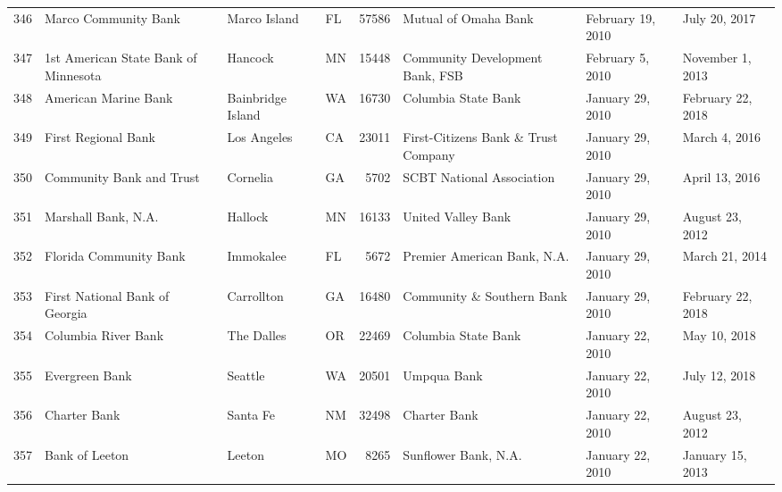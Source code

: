 \begin{tabular}{llllrlll}
346 &                               Marco Community Bank &        Marco Island &  FL &  57586 &                               Mutual of Omaha Bank &   February 19, 2010 &       July 20, 2017 \\
347 &               1st American State Bank of Minnesota &             Hancock &  MN &  15448 &                    Community Development Bank, FSB &    February 5, 2010 &    November 1, 2013 \\
348 &                               American Marine Bank &   Bainbridge Island &  WA &  16730 &                                Columbia State Bank &    January 29, 2010 &   February 22, 2018 \\
349 &                                First Regional Bank &         Los Angeles &  CA &  23011 &                First-Citizens Bank \& Trust Company &    January 29, 2010 &       March 4, 2016 \\
350 &                           Community Bank and Trust &            Cornelia &  GA &   5702 &                          SCBT National Association &    January 29, 2010 &      April 13, 2016 \\
351 &                                Marshall Bank, N.A. &             Hallock &  MN &  16133 &                                 United Valley Bank &    January 29, 2010 &     August 23, 2012 \\
352 &                             Florida Community Bank &           Immokalee &  FL &   5672 &                        Premier American Bank, N.A. &    January 29, 2010 &      March 21, 2014 \\
353 &                     First National Bank of Georgia &          Carrollton &  GA &  16480 &                          Community \& Southern Bank &    January 29, 2010 &   February 22, 2018 \\
354 &                                Columbia River Bank &          The Dalles &  OR &  22469 &                                Columbia State Bank &    January 22, 2010 &        May 10, 2018 \\
355 &                                     Evergreen Bank &             Seattle &  WA &  20501 &                                        Umpqua Bank &    January 22, 2010 &       July 12, 2018 \\
356 &                                       Charter Bank &            Santa Fe &  NM &  32498 &                                       Charter Bank &    January 22, 2010 &     August 23, 2012 \\
357 &                                     Bank of Leeton &              Leeton &  MO &   8265 &                               Sunflower Bank, N.A. &    January 22, 2010 &    January 15, 2013 \\

\end{tabular}
